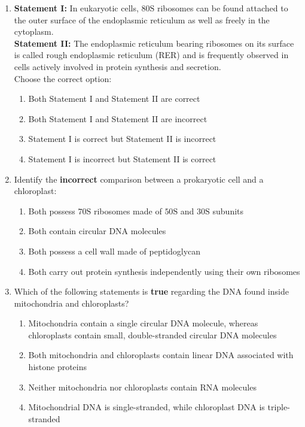\documentclass[11pt, a4paper]{article}
\begin{document}
\begin{enumerate}[label=\textbf{\arabic*.}, leftmargin=*, itemsep=8pt]
    \item \textbf{Statement I:} In eukaryotic cells, $80\text{S}$ ribosomes can be found attached to the outer surface of the endoplasmic reticulum as well as freely in the cytoplasm.\\
    \textbf{Statement II:} The endoplasmic reticulum bearing ribosomes on its surface is called rough endoplasmic reticulum (RER) and is frequently observed in cells actively involved in protein synthesis and secretion.\\
    Choose the correct option:
    \begin{enumerate}[label=(\alph*)]
        \item Both Statement I and Statement II are correct
        \item Both Statement I and Statement II are incorrect
        \item Statement I is correct but Statement II is incorrect
        \item Statement I is incorrect but Statement II is correct
    \end{enumerate}

    \item Identify the \textbf{incorrect} comparison between a prokaryotic cell and a chloroplast:
    \begin{enumerate}[label=(\alph*)]
        \item Both possess $70\text{S}$ ribosomes made of $50\text{S}$ and $30\text{S}$ subunits
        \item Both contain circular DNA molecules
        \item Both possess a cell wall made of peptidoglycan
        \item Both carry out protein synthesis independently using their own ribosomes
    \end{enumerate}

    \item Which of the following statements is \textbf{true} regarding the DNA found inside mitochondria and chloroplasts?
    \begin{enumerate}[label=(\alph*)]
        \item Mitochondria contain a single circular DNA molecule, whereas chloroplasts contain small, double-stranded circular DNA molecules
        \item Both mitochondria and chloroplasts contain linear DNA associated with histone proteins
        \item Neither mitochondria nor chloroplasts contain RNA molecules
        \item Mitochondrial DNA is single-stranded, while chloroplast DNA is triple-stranded
    \end{enumerate}


\end{enumerate}
\end{document}
